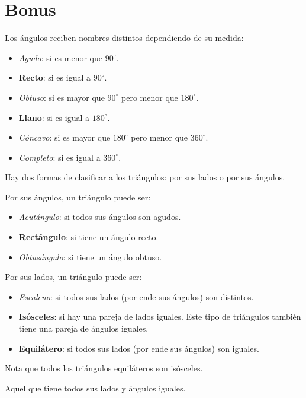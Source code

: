 \section{Bonus}

Los ángulos reciben nombres distintos dependiendo de su medida:

\begin{itemize}
    \item \textit{Agudo}: si es menor que \(90^\circ\).
    \item \textbf{Recto}: si es igual a \(90^\circ\).
    \item \textit{Obtuso}: si es mayor que \(90^\circ\) pero menor que \(180^\circ\).
    \item \textbf{Llano}: si es igual a \(180^\circ\).
    \item \textit{Cóncavo}: si es mayor que \(180^\circ\) pero menor que \(360^\circ\).
    \item \textit{Completo}: si es igual a \(360^\circ\).
\end{itemize}

Hay dos formas de clasificar a los triángulos: por sus lados o por sus ángulos.

Por sus ángulos, un triángulo puede ser:

\begin{itemize}
    \item \textit{Acutángulo}: si todos sus ángulos son agudos.
    \item \textbf{Rectángulo}: si tiene un ángulo recto.
    \item \textit{Obtusángulo}: si tiene un ángulo obtuso.
\end{itemize}

Por sus lados, un triángulo puede ser:

\begin{itemize}
    \item \textit{Escaleno}: si todos sus lados (por ende sus ángulos) son distintos.
    \item \textbf{Isósceles}: si hay una pareja de lados iguales. 
    Este tipo de triángulos también tiene una pareja de ángulos 
    iguales.
    \item \textbf{Equilátero}: si todos sus lados (por ende sus 
    ángulos) son iguales.
\end{itemize}

Nota que todos los triángulos equiláteros son isósceles.

\begin{definition}
    Aquel que tiene todos sus lados y ángulos iguales.
\end{definition}

